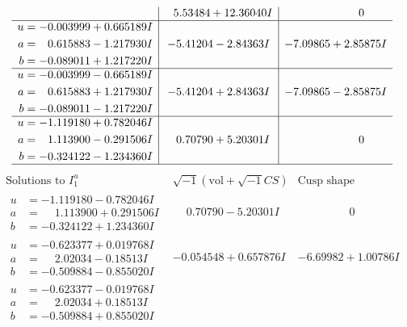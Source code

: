 \documentclass[1p]{elsarticle_modified}
\theoremstyle{definition}
\newcommand{\I}{\sqrt{-1}}
\begin{document}
$$\begin{array}{c|c|c}
 & \phantom{-}5.53484 + 12.36040 I & \phantom{-0.000000 } 0 \\ \hline\begin{aligned}
u &= -0.003999 + 0.665189 I \\
a &= \phantom{-}0.615883 - 1.217930 I \\
b &= -0.089011 + 1.217220 I\end{aligned}
 & -5.41204 - 2.84363 I & -7.09865 + 2.85875 I \\ \hline\begin{aligned}
u &= -0.003999 - 0.665189 I \\
a &= \phantom{-}0.615883 + 1.217930 I \\
b &= -0.089011 - 1.217220 I\end{aligned}
 & -5.41204 + 2.84363 I & -7.09865 - 2.85875 I \\ \hline\begin{aligned}
u &= -1.119180 + 0.782046 I \\
a &= \phantom{-}1.113900 - 0.291506 I \\
b &= -0.324122 - 1.234360 I\end{aligned}
 & \phantom{-}0.70790 + 5.20301 I & \phantom{-0.000000 } 0\\
 \hline 
 \end{array}$$\newpage$$\begin{array}{c|c|c}  
\text{Solutions to }I^u_{1}& \I (\text{vol} + \sqrt{-1}CS) & \text{Cusp shape}\\
 \hline 
\begin{aligned}
u &= -1.119180 - 0.782046 I \\
a &= \phantom{-}1.113900 + 0.291506 I \\
b &= -0.324122 + 1.234360 I\end{aligned}
 & \phantom{-}0.70790 - 5.20301 I & \phantom{-0.000000 } 0 \\ \hline\begin{aligned}
u &= -0.623377 + 0.019768 I \\
a &= \phantom{-}2.02034 - 0.18513 I \\
b &= -0.509884 - 0.855020 I\end{aligned}
 & -0.054548 + 0.657876 I & -6.69982 + 1.00786 I \\ \hline\begin{aligned}
u &= -0.623377 - 0.019768 I \\
a &= \phantom{-}2.02034 + 0.18513 I \\
b &= -0.509884 + 0.855020 I\end{aligned}

\end{array}$$
\end{document}
